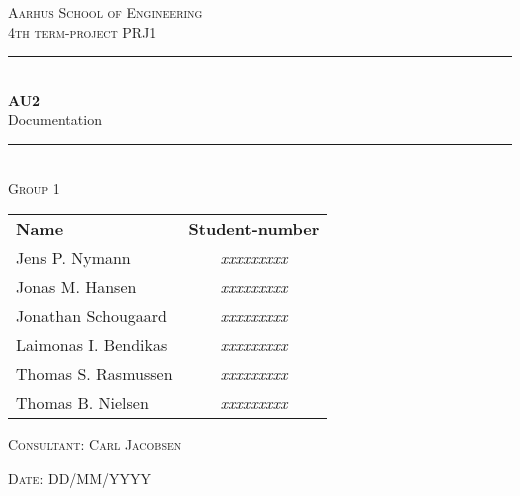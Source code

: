 \newcommand{\HRule}{\rule{\linewidth}{0.1mm}} %

\begin{center}
	
	\textsc{\LARGE Aarhus School of Engineering}\\[1.5cm] %
	
	\textsc{\large 4th term-project PRJ1}\\[2.5cm] 
	\HRule \\[0.8cm]
	{\huge \bfseries \textsc{AU2}} \\[0.5cm]{\LARGE Documentation} \\[0.4cm]
	\HRule \\[1.5cm]
	
	\textsc{\large Group 1}\\
	\vspace{0.5 in}
	\begin{center}
		\begin{tabular}{l c}
			\textbf{Name} & \textbf{Student-number} \\
			Jens P. Nymann & \textsl{xxxxxxxxx} \\
			Jonas M. Hansen & \textsl{xxxxxxxxx} \\
			Jonathan Schougaard & \textsl{xxxxxxxxx} \\
			Laimonas I. Bendikas & \textsl{xxxxxxxxx} \\
			Thomas S. Rasmussen & \textsl{xxxxxxxxx} \\
			Thomas B. Nielsen & \textsl{xxxxxxxxx} \\
		\end{tabular}
	\end{center}
	\vspace{0.5 in}
	
	\textsc{\large Consultant: Carl Jacobsen}
	\vspace{0.5 in}
	
	\textsc{\large Date: DD/MM/YYYY}\\
	
\end{center} %

\newpage